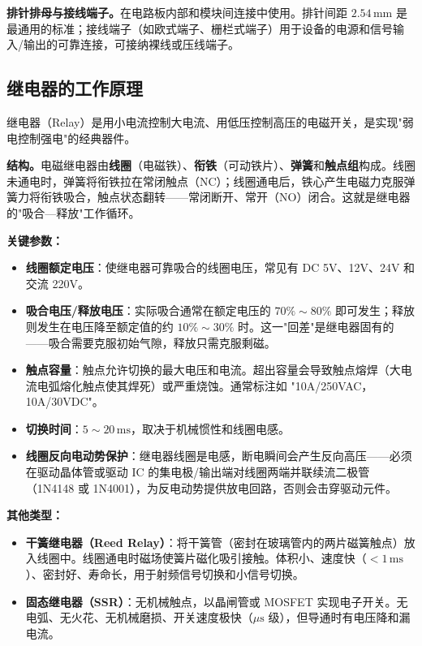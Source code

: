 \documentclass[12pt,UTF8]{ctexbook}
\begin{document}
\textbf{排针排母与接线端子。}在电路板内部和模块间连接中使用。排针间距 $2.54\,\mathrm{mm}$ 是最通用的标准；接线端子（如欧式端子、栅栏式端子）用于设备的电源和信号输入/输出的可靠连接，可接纳裸线或压线端子。

\subsection{继电器的工作原理}

继电器（Relay）是用小电流控制大电流、用低压控制高压的电磁开关，是实现"弱电控制强电"的经典器件。

\textbf{结构。}电磁继电器由\textbf{线圈}（电磁铁）、\textbf{衔铁}（可动铁片）、\textbf{弹簧}和\textbf{触点组}构成。线圈未通电时，弹簧将衔铁拉在常闭触点（NC）；线圈通电后，铁心产生电磁力克服弹簧力将衔铁吸合，触点状态翻转——常闭断开、常开（NO）闭合。这就是继电器的"吸合—释放"工作循环。

\textbf{关键参数：}
\begin{itemize}
  \item \textbf{线圈额定电压}：使继电器可靠吸合的线圈电压，常见有 DC 5V、12V、24V 和交流 220V。
  \item \textbf{吸合电压/释放电压}：实际吸合通常在额定电压的 $70\%\sim80\%$ 即可发生；释放则发生在电压降至额定值的约 $10\%\sim30\%$ 时。这一"回差"是继电器固有的——吸合需要克服初始气隙，释放只需克服剩磁。
  \item \textbf{触点容量}：触点允许切换的最大电压和电流。超出容量会导致触点熔焊（大电流电弧熔化触点使其焊死）或严重烧蚀。通常标注如 "10A/250VAC，10A/30VDC"。
  \item \textbf{切换时间}：$5\sim20\,\mathrm{ms}$，取决于机械惯性和线圈电感。
  \item \textbf{线圈反向电动势保护}：继电器线圈是电感，断电瞬间会产生反向高压——必须在驱动晶体管或驱动 IC 的集电极/输出端对线圈两端并联续流二极管（1N4148 或 1N4001），为反电动势提供放电回路，否则会击穿驱动元件。
\end{itemize}

\textbf{其他类型：}
\begin{itemize}
  \item \textbf{干簧继电器（Reed Relay）}：将干簧管（密封在玻璃管内的两片磁簧触点）放入线圈中。线圈通电时磁场使簧片磁化吸引接触。体积小、速度快（$<1\,\mathrm{ms}$）、密封好、寿命长，用于射频信号切换和小信号切换。
  \item \textbf{固态继电器（SSR）}：无机械触点，以晶闸管或 MOSFET 实现电子开关。无电弧、无火花、无机械磨损、开关速度极快（$\mu\mathrm{s}$ 级），但导通时有电压降和漏电流。
\end{itemize}
\end{document}
